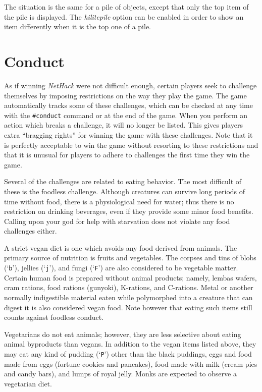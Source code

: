 \documentclass[titlepage]{article}
\begin{document}
The situation is the same for a pile of objects, except that only the
top item of the pile is displayed.
The
\textit{hilite\textunderscore pile}
option can be enabled in order to show an item differently when it is
the top one of a pile.

\section{Conduct}

As if winning \textit{NetHack} were not difficult enough, certain players
seek to challenge themselves by imposing restrictions on the
way they play the game.  The game automatically tracks some of
these challenges, which can be checked at any time with the \texttt{\#conduct}
command or at the end of the game.  When you perform an action which
breaks a challenge, it will no longer be listed.  This gives
players extra ``bragging rights'' for winning the game with these
challenges.  Note that it is perfectly acceptable to win the game
without resorting to these restrictions and that it is unusual for
players to adhere to challenges the first time they win the game.

Several of the challenges are related to eating behavior.  The most
difficult of these is the foodless challenge.  Although creatures
can survive long periods of time without food, there is a physiological
need for water; thus there is no restriction on drinking beverages,
even if they provide some minor food benefits.
Calling upon your god for help with starvation does
not violate any food challenges either.

A strict vegan diet is one which avoids any food derived from animals.
The primary source of nutrition is fruits and vegetables.  The
corpses and tins of blobs (`\texttt{b}'), jellies (`\texttt{j}'), and fungi
(`\texttt{F}') are also considered to be vegetable matter.  Certain human
food is prepared without animal products; namely, lembas wafers, cram
rations, food rations (gunyoki), K-rations, and C-rations.
Metal or another normally indigestible material eaten while polymorphed
into a creature that can digest it is also considered vegan food.
Note however that eating such items still counts against foodless conduct.

Vegetarians do not eat animals;
however, they are less selective about eating animal byproducts than vegans.
In addition to the vegan items listed above, they may eat any kind
of pudding (`\texttt{P}') other than the black puddings,
eggs and food made from eggs (fortune cookies and pancakes),
food made with milk (cream pies and candy bars), and lumps of
royal jelly.  Monks are expected to observe a vegetarian diet.
\end{document}

